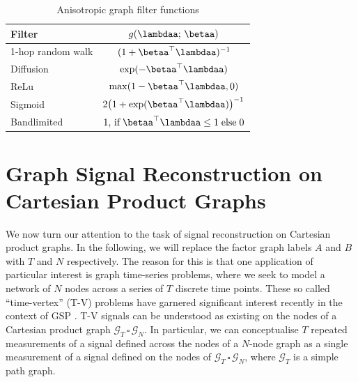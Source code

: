\begin{table}[t]
    \def\arraystretch{1.7}
    \small
    \begin{center}
    \begin{tabular}{|l|c|}
    \hline
    \textbf{Filter}   & $g(\lambdaa; \,\betaa)$    \\ 
    \hline
    1-hop random walk & $(1 + \betaa^\top\lambdaa)^{-1}$ \\
    \hline
    Diffusion         & $\exp(-\betaa^\top\lambdaa)$       \\
    \hline
    ReLu              & $\max (1 - \betaa^\top\lambdaa, 0)$  \\
    \hline
    Sigmoid           & $2 \big( 1 + \exp(\betaa^\top\lambdaa)\big)^{-1}$ \\
    \hline
    Bandlimited       & $1, \,\text{if} \; \betaa^\top\lambdaa \leq 1 \; \text{else} \; 0$   \\
    \hline
    \end{tabular}
    \end{center}
    \caption{Anisotropic graph filter functions}
    \label{tab:anis_filters}
    \end{table}



\section{Graph Signal Reconstruction on Cartesian Product Graphs}

\label{sec:gsr_cpg}

We now turn our attention to the task of signal reconstruction on Cartesian product graphs. In the following, we will replace the factor graph labels $A$ and $B$ with $T$ and $N$ respectively. The reason for this is that one application of particular interest is graph time-series problems, where we seek to model a network of $N$ nodes across a series of $T$ discrete time points. These so called ``time-vertex'' (T-V) problems have garnered significant interest recently in the context of GSP \citep{Grassi2018, Isufi2017, Loukas2016}. T-V signals can be understood as existing on the nodes of a Cartesian product graph $\mathcal{G}_T \, \square \, \mathcal{G}_N$. In particular, we can conceptualise $T$ repeated measurements of a signal defined across the nodes of a $N$-node graph as a single measurement of a signal defined on the nodes of $\mathcal{G}_T \, \square \, \mathcal{G}_N$, where $\mathcal{G}_T$ is a simple path graph.

\vspace{0.5cm}

